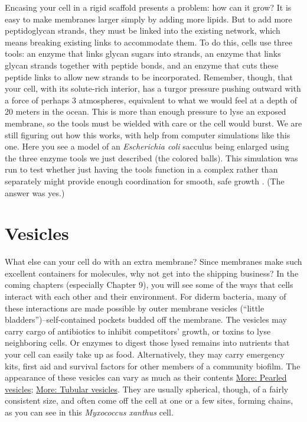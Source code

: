 \documentclass[]{tufte-book}
\begin{document}
Encasing your cell in a rigid scaffold presents a problem: how can it
grow? It is easy to make membranes larger simply by adding more lipids.
But to add more peptidoglycan strands, they must be linked into the
existing network, which means breaking existing links to accommodate
them. To do this, cells use three tools: an enzyme that links glycan
sugars into strands, an enzyme that links glycan strands together with
peptide bonds, and an enzyme that cuts these peptide links to allow new
strands to be incorporated. Remember, though, that your cell, with its
solute-rich interior, has a turgor pressure pushing outward with a force
of perhaps 3 atmospheres, equivalent to what we would feel at a depth of
20 meters in the ocean. This is more than enough pressure to lyse an
exposed membrane, so the tools must be wielded with care or the cell
would burst. We are still figuring out how this works, with help from
computer simulations like this one. Here you see a model of an
\emph{Escherichia coli} sacculus being enlarged using the three enzyme
tools we just described (the colored balls). This simulation was run to
test whether just having the tools function in a complex rather than
separately might provide enough coordination for smooth, safe growth
\citep{nguyen2015}. (The answer was yes.)

\section{Vesicles}\label{vesicles}

What else can your cell do with an extra membrane? Since membranes make
such excellent containers for molecules, why not get into the shipping
business? In the coming chapters (especially Chapter 9), you will see
some of the ways that cells interact with each other and their
environment. For diderm bacteria, many of these interactions are made
possible by outer membrane vesicles (``little
bladders'')--self-contained pockets budded off the membrane. The
vesicles may carry cargo of antibiotics to inhibit competitors' growth,
or toxins to lyse neighboring cells. Or enzymes to digest those lysed
remains into nutrients that your cell can easily take up as food.
Alternatively, they may carry emergency kits, first aid and survival
factors for other members of a community biofilm. The appearance of
these vesicles can vary as much as their contents
\protect\hyperlink{Pearled_vesicles}{More: Pearled vesicles};
\protect\hyperlink{Tubular_vesicles}{More: Tubular vesicles}. They are
usually spherical, though, of a fairly consistent size, and often come
off the cell at one or a few sites, forming chains, as you can see in
this \emph{Myxococcus xanthus} cell.
\end{document}
